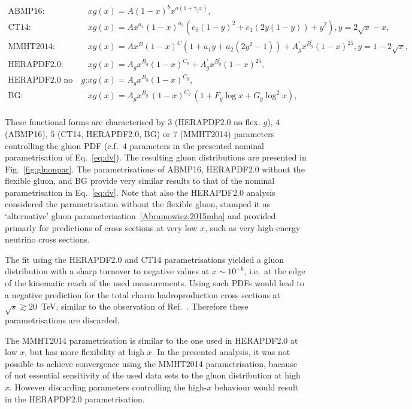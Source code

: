 \documentclass[12pt]{article}
\begin{document}
\begin{equation}
\begin{aligned}
\textrm{ABMP16:}~~~~~~ &xg(x)=A (1 - x)^b x^{a (1 + \gamma_{1} x)},\\
\textrm{CT14:}~~~~~~ &xg(x) = Ax^{a_1}(1-x)^{a_2}(e_0(1-y)^2+e_1(2y(1-y))+y^2), y=2\sqrt{x}-x,\\
\textrm{MMHT2014:}~~~~~~ &xg(x) = Ax^B(1-x)^C(1+a_1y+a_2(2y^2-1))+A^{\prime}_gx^{B^{\prime}_g}(1-x)^{25}, y=1-2\sqrt{x},\\ 
\textrm{HERAPDF2.0:}~~~~~~ &xg(x)=A_gx^{B_g}(1-x)^{C_g}+A^{\prime}_gx^{B^{\prime}_g}(1-x)^{25},\\
\textrm{HERAPDF2.0 no flex. $g$:}~~~~~~ &xg(x)=A_gx^{B_g}(1-x)^{C_g},\\
\textrm{BG:}~~~~~~ &xg(x)=A_{g} x^{B_{g}}\,(1-x)^{C_{g}}\, (1 + F_{g} {\log x} + G_{g} {\log^2 x}),\\
\end{aligned}
\label{eq:gluonpar}
\end{equation}

These functional forms are characterised by $3$ (HERAPDF2.0 no flex. $g$), $4$ (ABMP16), $5$ (CT14, HERAPDF2.0, BG) or $7$ (MMHT2014) parameters controlling the gluon PDF (c.f.\ $4$ parameters in the presented nominal parametrisation of Eq.~\ref{eq:dv}). 
The resulting gluon distributions are presented in Fig.~\ref{fig:gluonpar}. The parametrisations of ABMP16, HERAPDF2.0 without the flexible gluon, and BG provide very similar results to that of the nominal parametrisation in Eq.~\ref{eq:dv}. 
Note that also the HERAPDF2.0 analysis considered the parametrisation without the flexible gluon, stamped it as `alternative' gluon parameterisation~\ref{Abramowicz:2015mha} and provided primarly for predictions of cross sections at very low $x$, such as very high-energy neutrino cross sections.

The fit using the HERAPDF2.0 and CT14 parametrisations yielded a gluon distribution with a sharp turnover to negative values 
at $x \sim 10^{-6}$, i.e.\ at the edge of the kinematic reach of the used measurements. Using such PDFs would 
lead to a negative prediction for the total charm hadroproduction cross sections at $\sqrt{s} \gtrsim 20$~TeV, similar to the observation of Ref.~\cite{Accardi:2016ndt}. Therefore these parametrisations are discarded. 

The MMHT2014 parametrisation is similar to the one used in HERAPDF2.0 at low $x$, but has more flexibility at high $x$. 
In the presented analysis, it was not possible to achieve convergence using the MMHT2014 parametrisation, bacause of not essential sensitivity of the used data sets to the gluon distribution at high $x$. However discarding parameters controlling 
the high-$x$ behaviour would result in the HERAPDF2.0 parametrisation.
\end{document}
